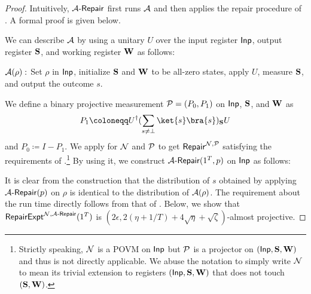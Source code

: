 \begin{proof}
Intuitively, $\mathcal{A}\text{-}\mathsf{Repair}$ first runs $\mathcal{A}$ and then applies the repair procedure of . A formal proof is given below. 

We can describe $\mathcal{A}$ by using a unitary $U$ over the input register $\mathsf{Inp}$, output register $\mathbf{S}$, and working register $\mathbf{W}$ as follows:
\begin{description}
\item $\mathcal{A}(\rho):$ Set $\rho$ in $\mathsf{Inp}$, initialize $\mathbf{S}$ and $\mathbf{W}$ to be all-zero states, apply $U$, measure $\mathbf{S}$, and output the outcome $s$. 
\end{description}
We define a binary projective measurement $\mathcal{P}=(P_0,P_1)$ on $\mathsf{Inp}$, $\mathbf{S}$, and $\mathbf{W}$ as 
$$
P_1 \coloneqq U^\dagger (\sum_{s\neq \bot}\ket{s}\bra{s})_{\regS} U
$$
and $P_0 \coloneqq I-P_1$. 
We apply  for $\mathcal{N}$ and $\mathcal{P}$ to get $\mathsf{Repair}^{\mathcal{N},\mathcal{P}}$ satisfying the requirements of .\footnote{
Strictly speaking, $\mathcal{N}$ is a POVM on $\mathsf{Inp}$ but $\mathcal{P}$ is a projector on  $(\mathsf{Inp},\mathbf{S},\mathbf{W})$ and thus   is not directly applicable.  
We abuse the notation to simply write $\mathcal{N}$ to mean its trivial extension  to registers $(\mathsf{Inp},\mathbf{S},\mathbf{W})$ that does not touch $(\mathbf{S},\mathbf{W})$.
} By using it, we construct $\mathcal{A}\text{-}\mathsf{Repair}(1^T,p)$ on $\mathsf{Inp}$ as follows:
It is clear from the construction that the distribution of $s$ obtained by applying $\mathcal{A}\text{-}\mathsf{Repair}(p)$ on $\rho$ is identical to the distribution of $\mathcal{A}(\rho)$. 
The requirement about the run time directly follows from that of . 
Below, we show that $\mathsf{RepairExpt}^{\mathcal{N},\mathcal{A}\text{-}\mathsf{Repair}}(1^T)$ is $(2\epsilon,2(\eta+1/T)+4\sqrt{\eta}+\sqrt{\zeta})$-almost projective. 


\end{proof}
